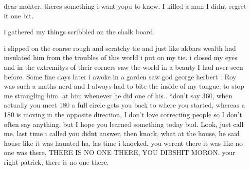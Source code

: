\documentclass[12pt,openany]{book}
\begin{document}
dear mohter,
theres something i want yopu to know. I killed a man
I didnt regret it one bit.

i gathered my things scribbled on the chalk board.

i slipped on the coarse rough and scratchy tie
and just like akbars
wealth had insulated him from the troubles of this world i put on my tie.
i closed my eyes and in the extremitys of their
corners saw the world in a beauty I had nver seen before.
Some fine days later i awoke in a garden saw god george herbert
:
Roy was such a maths nerd and
I always had to bite the inside
of my tongue, to stop me strangling him.
at him whenever he did one of his..
``don't say 360, when actually
you meet 180 a full
circle gets you back
to where you started, whereas
a 180 is moving in the opposite
direction, I don't love correcting
people so I don't often say anything,
but I hope you learned something today bud.
Look, just call me.
last time i called you didnt answer,
then knock,
what at the house, he said house like it was haunted ha,
las time i knocked, you werent there it was like no one was there,
THERE IS NO ONE THERE, YOU DIBSHIT MORON.
your right patrick, there is no one there.
\end{document}
